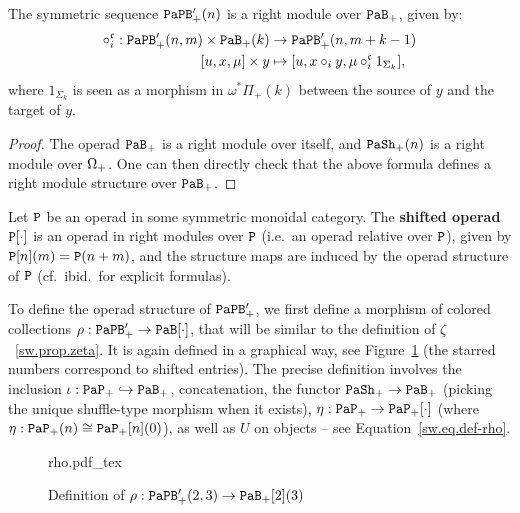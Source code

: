 \begin{lemma}
  The symmetric sequence $\mathtt{PaPB}_{+}'(n)$ is a right module over $\mathtt{PaB}_{+}$, given by:
  \begin{align*}
    \circ_{i}^{\mathfrak{c}} : \mathtt{PaPB}_{+}'(n,m) \times \mathtt{PaB}_{+}(k)
    & \to \mathtt{PaPB}_{+}'(n, m+k-1) \\
    [u,x,\mu] \times y
    & \mapsto [u, x \circ_{i} y, \mu \circ_{i}^{\mathfrak{c}}
      1_{\Sigma_{k}} ],
  \end{align*}
  where $1_{\Sigma_{k}}$ is seen as a morphism in $\omega^{*}\Pi_{+}(k)$ between the source of $y$ and the target of $y$.
\end{lemma}
\begin{proof}
  The operad $\mathtt{PaB}_{+}$ is a right module over itself, and $\mathtt{PaSh}_{+}(n)$ is a right module over $\Omega_{+}$.
  One can then directly check that the above formula defines a right module structure over $\mathtt{PaB}_{+}$.
\end{proof}

\begin{definition}
  Let $\mathtt{P}$ be an operad in some symmetric monoidal category.
  The \textbf{shifted operad} $\mathtt{P}[\cdot]$ \cite[§10.1]{Fresse2009} is an operad in right modules over $\mathtt{P}$ (i.e.\ an operad relative over $\mathtt{P}$), given by $\mathtt{P}[n](m) = \mathtt{P}(n+m)$, and the structure maps are induced by the operad structure of $\mathtt{P}$ (cf.\ ibid.\ for explicit formulas).
\end{definition}

To define the operad structure of $\mathtt{PaPB}'_{+}$, we first define a morphism of colored collections $\rho : \mathtt{PaPB}'_{+} \to \mathtt{PaB}[\cdot]$, that will be similar to the definition of $\zeta$~\ref{sw.prop.zeta}.
It is again defined in a graphical way, see Figure~\ref{sw.fig.rho} (the starred numbers correspond to shifted entries).
The precise definition involves the inclusion $\iota : \mathtt{PaP}_{+} \hookrightarrow \mathtt{PaB}_{+}$, concatenation, the functor $\mathtt{PaSh}_{+} \to \mathtt{PaB}_{+}$ (picking the unique shuffle-type morphism when it exists), $\eta : \mathtt{PaP}_{+} \to \mathtt{PaP}_{+}[\cdot]$ (where $\eta : \mathtt{PaP}_{+}(n) \cong \mathtt{PaP}_{+}[n](0)$), as well as $U$ on objects -- see Equation~\eqref{sw.eq.def-rho}.

\begin{figure}[htbp]
  \centering
  \def\svgwidth{\textwidth} {rho.pdf_tex}
  \caption{Definition of $\rho : \mathtt{PaPB}'_{+}(2,3) \to \mathtt{PaB}_{+}[2](3)$}
  \label{sw.fig.rho}
\end{figure}

